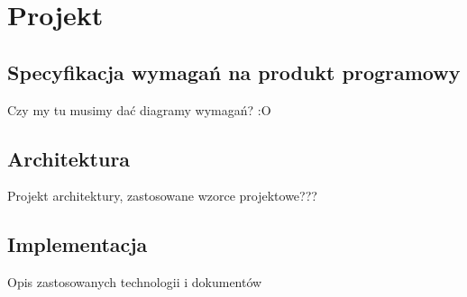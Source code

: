 \section{Projekt}
\subsection{Specyfikacja wymagań na produkt programowy}
Czy my tu musimy dać diagramy wymagań? :O
\subsection{Architektura}
Projekt architektury, zastosowane wzorce projektowe???
\subsection{Implementacja}
Opis zastosowanych technologii i dokumentów